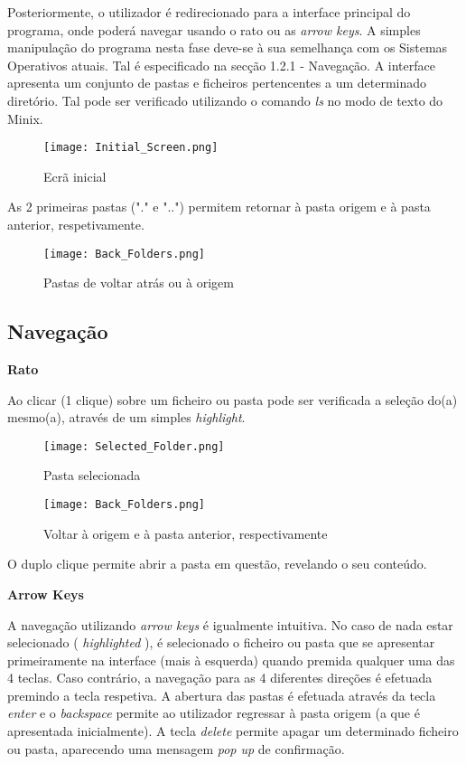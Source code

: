 \documentclass[a4paper]{article}
\begin{document}
	Posteriormente, o utilizador é redirecionado para a interface principal do programa, onde poderá navegar usando o rato ou as \textit{arrow keys}. A simples manipulação do programa nesta fase deve-se à sua semelhança com os Sistemas Operativos atuais. Tal é especificado na secção 1.2.1 - Navegação.
	A interface apresenta um conjunto de pastas e ficheiros pertencentes a um determinado diretório. Tal pode ser verificado utilizando o comando \textit{ls} no modo de texto do Minix.

\begin{figure}[h]
    \centering
     \texttt{[image: Initial\_Screen.png]}
    \caption{Ecrã inicial}
    \end{figure}
    


As 2 primeiras pastas ("." e "..") permitem retornar à pasta origem e à pasta anterior, respetivamente. 
	
\begin{figure}[h]
\centering
\texttt{[image: Back\_Folders.png]}
\caption{Pastas de voltar atrás ou à origem}
\end{figure}



\subsection{Navegação}
	
	\textbf{Rato}\bigskip

	Ao clicar (1 clique) sobre um ficheiro ou pasta pode ser verificada a seleção do(a) mesmo(a), através de um simples \textit{highlight}.


	
\begin{figure}[h]
\centering
\texttt{[image: Selected\_Folder.png]}
\caption{Pasta selecionada}
\end{figure}

\begin{figure}[h]
\centering
\texttt{[image: Back\_Folders.png]}
\caption{Voltar à origem e à pasta anterior, respectivamente}
\end{figure}


	

	O duplo clique permite abrir a pasta em questão, revelando o seu conteúdo.\bigskip

	\textbf{Arrow Keys}\bigskip

	A navegação utilizando \textit{arrow keys} é igualmente intuitiva. No caso de nada estar selecionado ( \textit{highlighted} ), é selecionado o ficheiro ou pasta que se apresentar primeiramente na interface (mais à esquerda) quando premida qualquer uma das 4 teclas. Caso contrário, a navegação para as 4 diferentes direções é efetuada premindo a tecla respetiva. 
	A abertura das pastas é efetuada através da tecla \textit{enter} e o \textit{backspace} permite ao utilizador regressar à pasta origem (a que é apresentada inicialmente).
	A tecla \textit{delete} permite apagar um determinado ficheiro ou pasta, aparecendo uma mensagem \textit{pop up} de confirmação.
\end{document}
